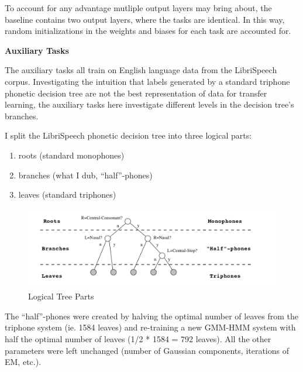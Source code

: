 \documentclass[a4paper]{article}
\begin{document}
To account for any advantage mutliple output layers may bring about, the baseline contains two output layers, where the tasks are identical. In this way, random initializations in the weights and biases for each task are accounted for.

\textbf{Auxiliary Tasks}

The auxiliary tasks all train on English language data from the LibriSpeech corpus. Investigating the intuition that labels generated by a standard triphone phonetic decision tree are not the best representation of data for transfer learning, the auxiliary tasks here investigate different levels in the decision tree's branches.

I split the LibriSpeech phonetic decision tree into three logical parts:

\begin{enumerate}
\item roots (standard monophones)
\item branches (what I dub, ``half''-phones)
\item leaves (standard triphones)
\end{enumerate}




\begin{figure}[!htbp]
  \centering
{}
  \includegraphics[width=\linewidth]{figs/levels.png}
  \caption{Logical Tree Parts}
\endminipage\hfill
\end{figure}


The ``half''-phones were created by halving the optimal number of leaves from the triphone system (ie. 1584 leaves) and re-training a new GMM-HMM system with half the optimal number of leaves (1/2 * 1584 = 792 leaves). All the other parameters were left unchanged (number of Gaussian components, iterations of EM, etc.). 
\end{document}

